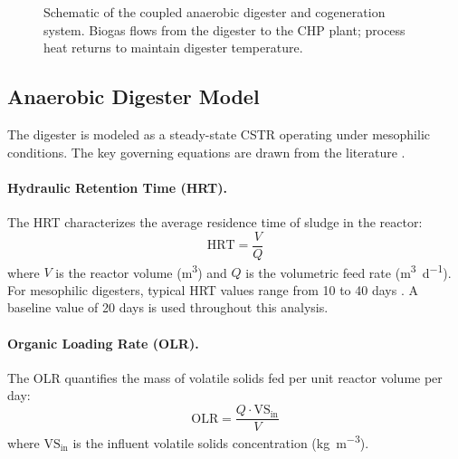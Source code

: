 \documentclass[12pt, letterpaper]{article}
\begin{document}
\begin{figure}[H]
  \centering
  \caption{Schematic of the coupled anaerobic digester and cogeneration system. Biogas flows from the digester to the CHP plant; process heat returns to maintain digester temperature.}
  \label{fig:system_diagram}
\end{figure}

\subsection{Anaerobic Digester Model}

The digester is modeled as a steady-state CSTR operating under mesophilic conditions. The key governing equations are drawn from the literature \citep{nathia2018}.

\paragraph{Hydraulic Retention Time (HRT).}
The HRT characterizes the average residence time of sludge in the reactor:
\begin{equation}
  \text{HRT} = \frac{V}{Q}
  \label{eq:hrt}
\end{equation}
where $V$ is the reactor volume (\si{\cubic\metre}) and $Q$ is the volumetric feed rate (\si{\cubic\metre\per\day}). For mesophilic digesters, typical HRT values range from 10 to 40 days \citep{nathia2018}. A baseline value of 20 days is used throughout this analysis.

\paragraph{Organic Loading Rate (OLR).}
The OLR quantifies the mass of volatile solids fed per unit reactor volume per day:
\begin{equation}
  \text{OLR} = \frac{Q \cdot \text{VS}_\text{in}}{V}
  \label{eq:olr}
\end{equation}
where $\text{VS}_\text{in}$ is the influent volatile solids concentration (\si{\kilo\gram\per\cubic\metre}).
\end{document}
